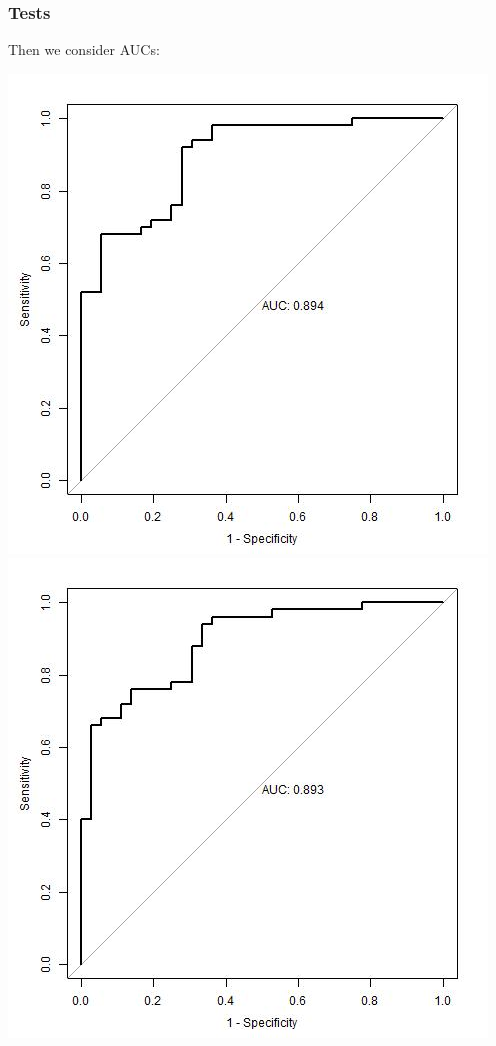 \documentclass[12pt,a4paper]{article}
\begin{document}
\subsubsection{Tests}
Then we consider AUCs:
\begin{center}
\includegraphics[scale = 0.4]{forwardA.jpg}
\includegraphics[scale = 0.4]{forwardB.jpg}
\end{center}
\end{document}
